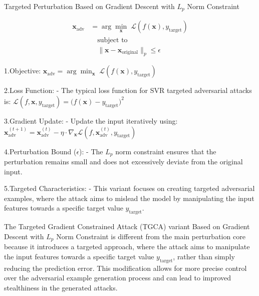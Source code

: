 Targeted Perturbation Based on Gradient Descent with $L_p$ Norm Constraint

\begin{align*}
\mathbf{x}_{\text{adv}} &= \arg \min_{\mathbf{x}} \; \mathcal{L}(f(\mathbf{x}), y_{\text{target}}) \\
&\quad \text{subject to} \\
&\quad \|\mathbf{x} - \mathbf{x}_{\text{original}}\|_p \leq \epsilon
\end{align*}

1.Objective:
   $\mathbf{x}_{\text{adv}} = \arg \min_{\mathbf{x}} \; \mathcal{L}(f(\mathbf{x}), y_{\text{target}})$

2.Loss Function:
   - The typical loss function for SVR targeted adversarial attacks is:
     $\mathcal{L}(f, \mathbf{x}, y_{\text{target}}) = \big(f(\mathbf{x}) - y_{\text{target}}\big)^2$

3.Gradient Update:
   - Update the input iteratively using:
     $\mathbf{x}_{\text{adv}}^{(t+1)} = \mathbf{x}_{\text{adv}}^{(t)} - \eta \cdot \nabla_{\mathbf{x}} \mathcal{L}(f, \mathbf{x}_{\text{adv}}^{(t)}, y_{\text{target}})$

4.Perturbation Bound ($\epsilon$):
   - The $L_p$ norm constraint ensures that the perturbation remains small and does not excessively deviate from the original input.

5.Targeted Characteristics:
   - This variant focuses on creating targeted adversarial examples, where the attack aims to mislead the model by manipulating the input features towards a specific target value $y_{\text{target}}$.


The Targeted Gradient Constrained Attack (TGCA) variant Based on Gradient Descent with $L_p$ Norm Constraint is different from the main perturbation core because it introduces a targeted approach, where the attack aims to manipulate the input features towards a specific target value $y_{\text{target}}$, rather than simply reducing the prediction error. This modification allows for more precise control over the adversarial example generation process and can lead to improved stealthiness in the generated attacks.